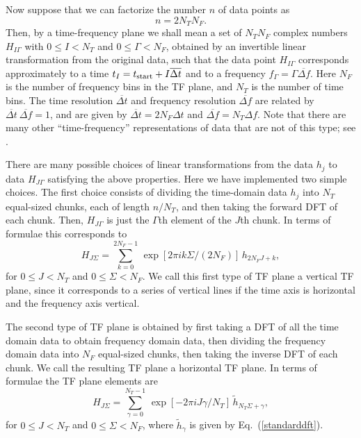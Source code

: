 Now suppose that we can factorize the number $n$ of data points as
\begin{equation}
n = 2 N_T N_F.
\end{equation}
Then, by a time-frequency plane we shall mean a set of $N_T N_F$ complex
numbers $H_{I\Gamma}$ with $0 \le I < N_T$ and $0 \le \Gamma < N_F$, obtained
by an invertible linear transformation from the original data, such  that the
data point $H_{I\Gamma}$ corresponds approximately to a time $t_I = t_{\rm
start} + I {\overline {\Delta t}}$ and to a frequency $f_\Gamma = \Gamma
{\overline {\Delta f}}$.  Here $N_F$ is the number of frequency bins in the TF
plane, and $N_T$ is the number of time bins.  The time resolution ${\overline
{\Delta t}}$ and frequency resolution ${\overline {\Delta f}}$ are related by
${\overline {\Delta t}} \ {\overline {\Delta f}} =1$, and are given by
${\overline {\Delta t}} = 2 N_F \Delta t$ and ${\overline {\Delta f}} = N_T
\Delta f$.  Note that there are many other ``time-frequency'' representations
of data that are not of this type; see \cite{ab:1999}.


There are many possible choices of linear transformations from the data $h_j$
to data $H_{J\Gamma}$ satisfying the above properties.  Here we have
implemented two simple choices.  The first choice consists of dividing the
time-domain data $h_j$ into $N_T$ equal-sized chunks, each of length $n/N_T$,
and then taking the forward DFT of each chunk.  Then, $H_{J\Gamma}$ is just
the $\Gamma$th element of the $J$th chunk.  In terms of formulae this
corresponds to
\begin{equation}
H_{J\Sigma} = \sum_{k=0}^{2 N_F-1} \, \exp \left[ 2 \pi i k \Sigma / (2
N_F) \right] \, h_{2 N_F J + k},
\label{verticalTFP}
\end{equation}
for $0 \le J < N_T$ and $0 \le \Sigma < N_F$.  We call this first type
of TF plane a vertical TF plane, since it corresponds to a series of
vertical lines if the time axis is horizontal and the frequency axis
vertical. 

The second type of TF plane is obtained by first taking a DFT of all the time
domain data to obtain frequency domain data, then dividing the frequency
domain data into $N_F$ equal-sized chunks, then taking the inverse DFT of each
chunk.  We call the resulting TF plane a horizontal TF plane. In terms of
formulae the TF plane elements are \begin{equation} H_{J\Sigma} =
\sum_{\gamma=0}^{N_T-1} \, \exp \left[ -2 \pi i J \gamma / N_T \right] \,
{\tilde h}_{N_T \Sigma + \gamma}, \label{horizontalTFP} \end{equation} for $0
\le J < N_T$ and $0 \le \Sigma < N_F$, where ${\tilde h}_\gamma$ is given by
Eq.\ (\ref{standarddft}).


